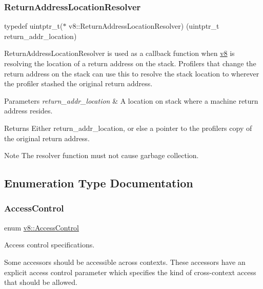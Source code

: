 \subsubsection{\texorpdfstring{Return\+Address\+Location\+Resolver}{ReturnAddressLocationResolver}}
{\footnotesize\ttfamily typedef uintptr\+\_\+t($\ast$ v8\+::\+Return\+Address\+Location\+Resolver) (uintptr\+\_\+t return\+\_\+addr\+\_\+location)}

Return\+Address\+Location\+Resolver is used as a callback function when \mbox{\hyperlink{namespacev8}{v8}} is resolving the location of a return address on the stack. Profilers that change the return address on the stack can use this to resolve the stack location to wherever the profiler stashed the original return address.


\begin{DoxyParams}{Parameters}
{\em return\+\_\+addr\+\_\+location} & A location on stack where a machine return address resides. \\
\hline
\end{DoxyParams}
\begin{DoxyReturn}{Returns}
Either return\+\_\+addr\+\_\+location, or else a pointer to the profiler\textquotesingle{}s copy of the original return address.
\end{DoxyReturn}
\begin{DoxyNote}{Note}
The resolver function must not cause garbage collection. 
\end{DoxyNote}


\subsection{Enumeration Type Documentation}
\mbox{\label{namespacev8_a31d8355cb043d7d2dda3f4a52760b64e}} 
\subsubsection{\texorpdfstring{Access\+Control}{AccessControl}}
{\footnotesize\ttfamily enum \mbox{\hyperlink{namespacev8_a31d8355cb043d7d2dda3f4a52760b64e}{v8\+::\+Access\+Control}}}

Access control specifications.

Some accessors should be accessible across contexts. These accessors have an explicit access control parameter which specifies the kind of cross-\/context access that should be allowed.

